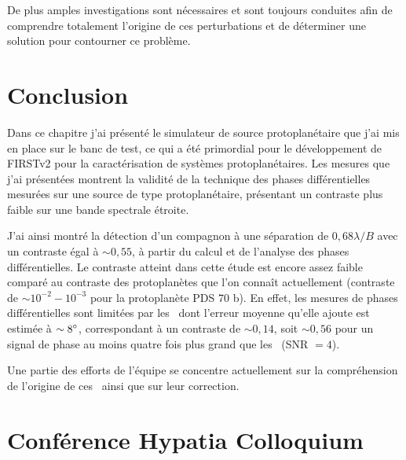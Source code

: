 De plus amples investigations sont nécessaires et sont toujours conduites afin de comprendre totalement l'origine de ces perturbations et de déterminer une solution pour contourner ce problème.


\section{Conclusion}

Dans ce chapitre j'ai présenté le simulateur de source protoplanétaire que j'ai mis en place sur le banc de test, ce qui a été primordial pour le développement de \ac{FIRSTv2} pour la caractérisation de systèmes protoplanétaires. Les mesures que j'ai présentées montrent la validité de la technique des phases différentielles mesurées sur une source de type protoplanétaire, présentant un contraste plus faible sur une bande spectrale étroite.

J'ai ainsi montré la détection d'un compagnon à une séparation de $0,68 \lambda / B$ avec un contraste égal à $\sim 0,55$, à partir du calcul et de l'analyse des phases différentielles. Le contraste atteint dans cette étude est encore assez faible comparé au contraste des protoplanètes que l'on connaît actuellement (contraste de $\sim 10^{-2} - 10^{-3}$ pour la protoplanète PDS 70 b). En effet, les mesures de phases différentielles sont limitées par les \wiggles~dont l'erreur moyenne qu'elle ajoute est estimée à $\sim 8^{\circ}$, correspondant à un contraste de $\sim 0,14$, soit $\sim 0,56$ pour un signal de phase au moins quatre fois plus grand que les \wiggles~(\ac{SNR} $= 4$).

Une partie des efforts de l'équipe se concentre actuellement sur la compréhension de l'origine de ces \wiggles~ainsi que sur leur correction.


\clearpage
\section*{Conférence Hypatia Colloquium}
\label{sec:HypatiaProceeding}
{}

\clearpage


